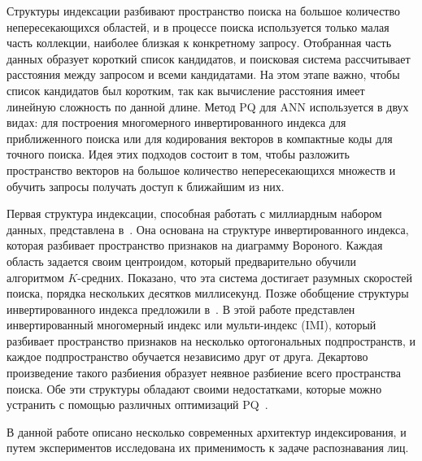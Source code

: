 Структуры индексации разбивают пространство поиска на большое количество непересекающихся областей, и в процессе поиска используется только малая часть коллекции, наиболее близкая к конкретному запросу. Отобранная часть данных образует короткий список кандидатов, и поисковая система рассчитывает расстояния между запросом и всеми кандидатами. На этом этапе важно, чтобы список кандидатов был коротким, так как вычисление расстояния имеет линейную сложность по данной длине. Метод PQ для ANN используется в двух видах: для построения многомерного инвертированного индекса для приближенного поиска или для кодирования векторов в компактные коды для точного поиска. Идея этих подходов состоит в том, чтобы разложить пространство векторов на большое количество непересекающихся множеств и обучить запросы получать доступ к ближайшим из них.

Первая структура индексации, способная работать с миллиардным набором данных, представлена в~\cite{1}. Она основана на структуре инвертированного индекса, которая разбивает пространство признаков на диаграмму Вороного. Каждая область задается своим центроидом, который предварительно обучили алгоритмом $K$-средних. Показано, что эта система достигает разумных скоростей поиска, порядка нескольких десятков миллисекунд. Позже обобщение структуры инвертированного индекса предложили в~\cite{3}. В этой работе представлен инвертированный многомерный индекс или мульти-индекс (IMI), который разбивает пространство признаков на несколько ортогональных подпространств, и каждое подпространство обучается независимо друг от друга. Декартово произведение такого разбиения образует неявное разбиение всего пространства поиска. Обе эти структуры обладают своими недостатками, которые можно устранить с помощью различных оптимизаций PQ~\cite{6,7}.

В данной работе описано несколько современных архитектур индексирования, и путем экспериментов исследована их применимость к задаче распознавания лиц.